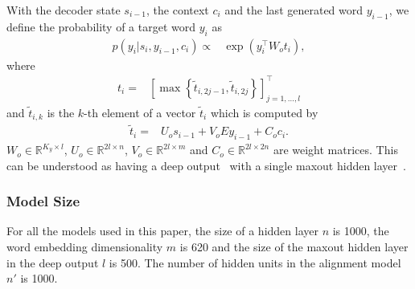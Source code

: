 With the decoder state $s_{i-1}$, the context $c_{i}$ and the last generated word
$y_{i-1}$, we define the probability of a target word $y_{i}$ as
\begin{align*}
    p(y_{i}|s_i,y_{i-1},c_{i}) \propto& \exp\left(y_{i}^{\top} W_o t_{i}\right),
\end{align*}
where
\begin{align*}
    t_i =&  \left[ \max\left\{\tilde{t}_{i, 2j-1}, \tilde{t}_{i,2j}\right\}
    \right]_{j=1,\ldots,l}^{\top}
\end{align*}
and $\tilde{t}_{i,k}$ is the $k$-th element of a vector $\tilde{t}_i$ which is
computed by
\begin{align*}
    \tilde{t}_{i} =& U_o s_{i - 1} + V_o E y_{i-1} + C_o c_i.
\end{align*}
$W_o \in \mathbb{R}^{K_y\times  l}$, $U_o \in \mathbb{R}^{2l\times n}$, $V_o \in
\mathbb{R}^{2l\times m}$ and $C_o \in \mathbb{R}^{2l\times 2n}$ are weight
matrices. This can be understood as having a deep output~\citep{Pascanu2014rec}
with a single maxout hidden layer~\citep{Goodfellow2013}.

\subsubsection{Model Size}

For all the models used in this paper, the size of a hidden layer $n$ is 1000,
the word embedding dimensionality $m$ is 620 and the size of the maxout hidden
layer in the deep output $l$ is 500. The number of hidden units in the alignment
model $n'$ is 1000.

